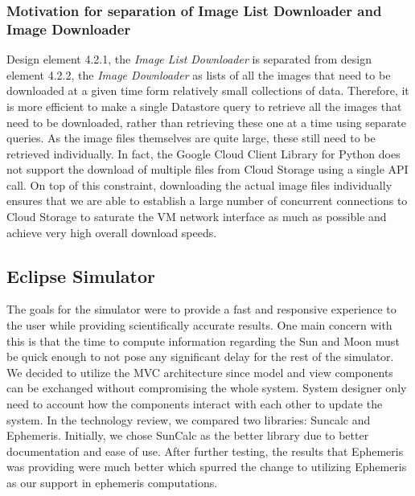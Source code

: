 \documentclass[10pt, onecolumn, draftclsnofoot, letterpaper, compsoc]{IEEEtran}
\begin{document}
    \subsubsection{Motivation for separation of Image List Downloader and Image Downloader}
    Design element 4.2.1, the \textit{Image List Downloader} is separated from design element 4.2.2, the
    \textit{Image Downloader} as lists of all the images that need to be downloaded at a given time form
    relatively small collections of data. Therefore, it is more efficient to make a single Datastore query to
    retrieve all the images that need to be downloaded, rather than retrieving these one at a time using
    separate queries. As the image files themselves are quite large, these still need to be retrieved
    individually. In fact, the Google Cloud Client Library for Python does not support the download of multiple
    files from Cloud Storage using a single API call. On top of this constraint, downloading the actual image
    files individually ensures that we are able to establish a large number of concurrent connections to Cloud
    Storage to saturate the VM network interface as much as possible and achieve very high overall download
    speeds. \\

\subsection{Eclipse Simulator}


The goals for the simulator were to provide a fast and
responsive experience to the user while providing
scientifically accurate results. One main concern with this
is that the time to compute information regarding the Sun
and Moon must be quick enough to not pose any significant
delay for the rest of the simulator. \\

We decided to utilize the MVC architecture since model and
view components can be exchanged without compromising the
whole system. System designer only need to account how the
components interact with each other to update the system.
In the technology review, we compared two libraries: Suncalc
and Ephemeris. Initially, we chose SunCalc as the better
library due to better documentation and ease of use. After
further testing, the results that Ephemeris was providing
were much better which spurred the change to utilizing
Ephemeris as our support in ephemeris computations. \\
\end{document}
